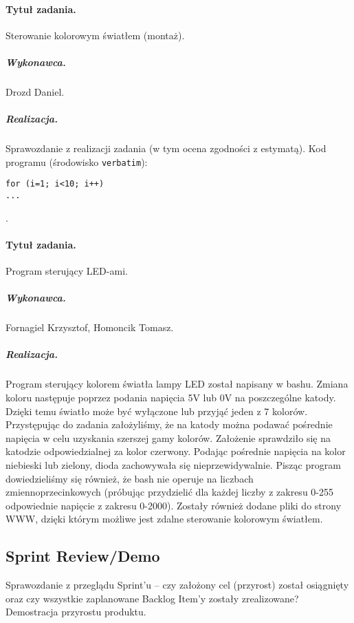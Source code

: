 \paragraph{Tytuł zadania.} Sterowanie kolorowym światłem (montaż).
\subparagraph{Wykonawca.} Drozd Daniel.
\subparagraph{Realizacja.} Sprawozdanie z realizacji zadania (w tym ocena zgodności z estymatą). Kod programu (środowisko \texttt{verbatim}): \begin{verbatim}
for (i=1; i<10; i++)
...
\end{verbatim}.

\paragraph{Tytuł zadania.} Program sterujący LED-ami.
\subparagraph{Wykonawca.} Fornagiel Krzysztof, Homoncik Tomasz.
\subparagraph{Realizacja.} Program sterujący kolorem światła lampy LED został napisany w bashu. Zmiana koloru następuje poprzez podania napięcia 5V lub 0V na poszczególne katody. Dzięki temu światło może być wyłączone lub przyjąć jeden z 7 kolorów. Przystępując do zadania założyliśmy, że na katody można podawać pośrednie napięcia w celu uzyskania szerszej gamy kolorów. Założenie sprawdziło się na katodzie odpowiedzialnej za kolor czerwony. Podając pośrednie napięcia na kolor niebieski lub zielony, dioda zachowywała się nieprzewidywalnie. Pisząc program dowiedzieliśmy się również, że bash nie operuje na liczbach zmiennoprzecinkowych (próbując przydzielić dla każdej liczby z zakresu 0-255 odpowiednie napięcie z zakresu 0-2000). Zostały również dodane pliki do strony WWW, dzięki którym możliwe jest zdalne sterowanie kolorowym światłem.


\subsection{Sprint Review/Demo}
Sprawozdanie z przeglądu Sprint'u -- czy założony cel (przyrost) został osiągnięty oraz czy wszystkie zaplanowane Backlog Item'y zostały zrealizowane? Demostracja przyrostu produktu.
